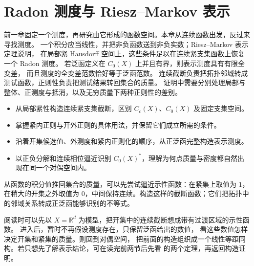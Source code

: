 \chapter{Radon 测度与 Riesz–Markov 表示}
\label{b1:ch:11}
\begin{chapterabstract}
前一章固定一个测度，再研究由它形成的函数空间。本章从连续函数出发，反过来寻找测度。
一个积分应当线性，并把非负函数送到非负实数；Riesz--Markov 表示定理说明，
在局部紧 Hausdorff 空间上，这些条件足以在连续紧支集函数上恢复一个 Radon 测度。
若泛函定义在 \(C_0(X)\) 上并且有界，则表示测度具有有限全变差，
而且测度的全变差范数恰好等于泛函范数。
连续截断负责把拓扑邻域转成测试函数，正则性负责把测试结果转回集合的质量。
证明中需要分别处理局部与整体、正测度与抵消，以及无穷质量下两种正则性的差别。
\end{chapterabstract}

\begin{learninggoals}
\begin{itemize}
\item\label{b1:item:11-goal-cutoff}从局部紧性构造连续紧支集截断，区别 \(C_c(X)\)、\(C_0(X)\) 及固定支集空间。
\item\label{b1:item:11-goal-regularity}掌握紧内正则与开外正则的具体用法，并保留它们成立所需的条件。
\item\label{b1:item:11-goal-construction}沿着开集候选值、外测度和紧内正则化的顺序，从正泛函完整构造表示测度。
\item\label{b1:item:11-goal-duality}以正负分解和连续相位逼近识别 \(C_0(X)^*\)，理解为何点质量与密度都自然出现在同一个对偶空间内。
\end{itemize}
\end{learninggoals}

从函数的积分值推回集合的质量，可以先尝试逼近示性函数：在紧集上取值为 \(1\)，在稍大的开集之外取值为 \(0\)，中间保持连续。构造这样的截断函数；它们把拓扑中的邻域关系转成正泛函能够识别的不等式。

\ProseParagraphBreak

阅读时可以先以 \(X=\mathbb R^d\) 为模型，把开集中的连续截断想成带有过渡区域的示性函数。
进入后，暂时不再假设测度存在，只保留泛函给出的数值，
看这些数值怎样决定开集和紧集的质量。则回到对偶空间，
把前面的构造组织成一个线性等距同构。若只想先了解表示结论，可在读完前两节后先看
的两个定理，再返回构造证明。


